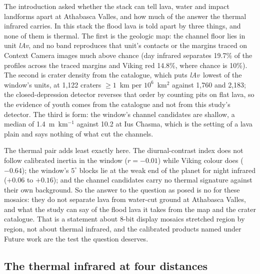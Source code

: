 \documentclass[twocolumn]{aastex701}
\newcommand{\lAv}{\textit{lAv}}
\begin{document}
The introduction asked whether the stack can tell lava, water and impact landforms apart at Athabasca Valles, and
how much of the answer the thermal infrared carries. In this stack the flood lava is told apart by three things, and
none of them is thermal. The first is the geologic map: the channel floor lies in unit \lAv, and no band reproduces
that unit's contacts or the margins traced on Context Camera images much above chance (day infrared separates 19.7\%
of the profiles across the traced margins and Viking red 14.8\%, where chance is 10\%). The second is crater density
from the catalogue, which puts \lAv\ lowest of the window's units, at 1,122 craters $\ge1$~km per $10^6$~km$^2$
against 1,760 and 2,183; the closed-depression detector reverses that order by counting pits on flat lava, so the
evidence of youth comes from the catalogue and not from this study's detector. The third is form: the window's
channel candidates are shallow, a median of 1.4~m~km$^{-1}$ against 10.2 at Ius Chasma, which is the setting of a
lava plain and says nothing of what cut the channels. %

The thermal pair adds least exactly here. The diurnal-contrast index does not follow calibrated inertia in the
window ($r=-0.01$) while Viking colour does ($-0.64$); the window's $5^{\circ}$ blocks lie at the weak end of the
planet for night infrared ($+0.06$ to $+0.16$); and the channel candidates carry no thermal signature against their
own background. So the answer to the question as posed is no for these mosaics: they do not separate lava from
water-cut ground at Athabasca Valles, and what the study can say of the flood lava it takes from the map and the
crater catalogue. That is a statement about 8-bit display mosaics stretched region by region, not about thermal
infrared, and the calibrated products named under Future work are the test the question deserves.

\subsection{The thermal infrared at four distances} \label{sec:scales}
\end{document}
